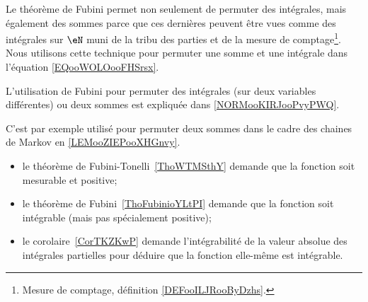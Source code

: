 \begin{description}
	\item[Fubini]
	      Le théorème de Fubini permet non seulement de permuter des intégrales, mais également des sommes parce que ces dernières peuvent être vues comme des intégrales sur \( \eN\) muni de la tribu des parties et de la mesure de comptage\footnote{Mesure de comptage, définition \ref{DEFooILJRooByDzhs}.}. Nous utilisons cette technique pour permuter une somme et une intégrale dans l'équation \eqref{EQooWOLOooFHSrsx}.
	\item
	      L'utilisation de Fubini pour permuter des intégrales (sur deux variables différentes) ou deux sommes est expliquée dans \ref{NORMooKIRJooPvyPWQ}.

	      C'est par exemple utilisé pour permuter deux sommes dans le cadre des chaines de Markov en \ref{LEMooZIEPooXHGnvy}.
	      \begin{itemize}
		      \item
		            le théorème de Fubini-Tonelli~\ref{ThoWTMSthY} demande que la fonction soit mesurable et positive;
		      \item
		            le théorème de Fubini~\ref{ThoFubinioYLtPI} demande que la fonction soit intégrable (mais pas spécialement positive);
		      \item
		            le corolaire~\ref{CorTKZKwP} demande l'intégrabilité de la valeur absolue des intégrales partielles pour déduire que la fonction elle-même est intégrable.
	      \end{itemize}


\end{description}
